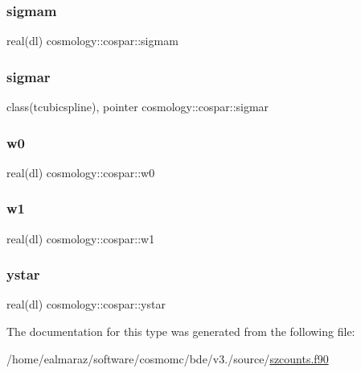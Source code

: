 \subsubsection{\texorpdfstring{sigmam}{sigmam}}
{\footnotesize\ttfamily real(dl) cosmology\+::cospar\+::sigmam}

\mbox{\label{structcosmology_1_1cospar_a7425df85ecf8cfa6a11e9a69e123fcf8}} 
\subsubsection{\texorpdfstring{sigmar}{sigmar}}
{\footnotesize\ttfamily class(tcubicspline), pointer cosmology\+::cospar\+::sigmar}

\mbox{\label{structcosmology_1_1cospar_a2d89c36381ff2f70e695b2f8bddde3d7}} 
\subsubsection{\texorpdfstring{w0}{w0}}
{\footnotesize\ttfamily real(dl) cosmology\+::cospar\+::w0}

\mbox{\label{structcosmology_1_1cospar_a1b66e4499cb4977d1000f23ba647a95a}} 
\subsubsection{\texorpdfstring{w1}{w1}}
{\footnotesize\ttfamily real(dl) cosmology\+::cospar\+::w1}

\mbox{\label{structcosmology_1_1cospar_a28f0a6ad5d2ad23a4d09eab5bea6b040}} 
\subsubsection{\texorpdfstring{ystar}{ystar}}
{\footnotesize\ttfamily real(dl) cosmology\+::cospar\+::ystar}



The documentation for this type was generated from the following file\+:\begin{DoxyCompactItemize}
\item 
/home/ealmaraz/software/cosmomc/bde/v3./source/\mbox{\hyperlink{szcounts_8f90}{szcounts.\+f90}}\end{DoxyCompactItemize}
